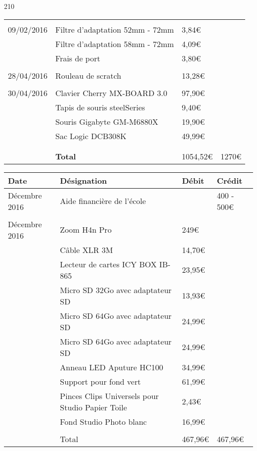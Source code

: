 \begin{textblock}{210}
\begin{center}
\begin{tabular}{|p{3cm}|p{8cm}|p{2cm}|p{2cm}|}
		& & & \\

		09/02/2016 & Filtre d'adaptation 52mm - 72mm & 3,84\euro{} & \\
		& Filtre d'adaptation 58mm - 72mm & 4,09\euro{} & \\
		& Frais de port & 3,80\euro{} & \\

		& & & \\

		28/04/2016 & Rouleau de scratch & 13,28\euro & \\

		& & & \\
		30/04/2016 & Clavier Cherry MX-BOARD 3.0 & 97,90\euro{} & \\
		& Tapis de souris steelSeries & 9,40\euro{} & \\
		& Souris Gigabyte GM-M6880X & 19,90\euro{} & \\
		& Sac Logic DCB308K  & 49,99\euro{} & \\

		& & & \\
		\hline
		& & & \\
		& \textbf{Total } & 1054,52\euro{} & 1270\euro{}\\
		\hline
	\end{tabular}
\end{center}
\end{textblock}

\clearpage
\hspace{-1.65cm}
\begin{tabular}{|p{3cm}|p{8cm}|p{2cm}|p{2cm}|}
	\hline
	\textbf{Date} & \textbf{Désignation} & \textbf{Débit} & \textbf{Crédit}\\
    \hline
		Décembre 2016 & Aide financière de l'école & & 400 - 500\euro{} \\

		& & & \\

		Décembre 2016 & Zoom H4n Pro & 249\euro{} & \\
		& Câble XLR 3M & 14,70\euro{} & \\
		& Lecteur de cartes ICY BOX IB-865 & 23,95\euro{} & \\
		& Micro SD 32Go avec adaptateur SD & 13,93\euro{} & \\
		& Micro SD 64Go avec adaptateur SD & 24,99\euro{} & \\
		& Micro SD 64Go avec adaptateur SD & 24,99\euro{} & \\
		& Anneau LED Aputure HC100 & 34,99\euro{} & \\
		& Support pour fond vert & 61,99\euro{} & \\
		& Pinces Clips Universels pour Studio Papier Toile  & 2,43\euro{} & \\
		& Fond Studio Photo blanc & 16,99\euro{} &  \\
		\hline
		& & & \\
		& Total & 467,96\euro{} & 467,96\euro{}\\
		\hline
\end{tabular}


